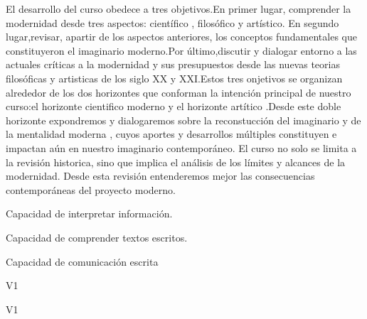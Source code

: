 \begin{syllabus}


\begin{justification}
El desarrollo del curso obedece a tres objetivos.En primer lugar, comprender la modernidad desde tres aspectos: científico , filosófico y artístico.
En segundo lugar,revisar, apartir de los aspectos anteriores, los conceptos fundamentales que constituyeron el imaginario moderno.Por último,discutir y 
dialogar entorno a las actuales críticas a la modernidad y sus presupuestos desde las nuevas teorias filosóficas y artisticas de los siglo XX y XXI.Estos
tres onjetivos se organizan alrededor de los dos horizontes que conforman la intención principal de nuestro curso:el horizonte cientifico moderno y el horizonte
artítico .Desde este doble horizonte expondremos y dialogaremos sobre la reconstucción del imaginario y de la mentalidad moderna , cuyos aportes y desarrollos 
múltiples constituyen e impactan aún en nuestro imaginario contemporáneo. El curso no solo se limita a la revisión historica, sino que implica el análisis de los
límites y alcances de la modernidad. Desde esta revisión entenderemos mejor las consecuencias contemporáneas del proyecto moderno.

\end{justification}

\begin{goals}
\item Capacidad de interpretar información.
\item Capacidad de comprender textos escritos.
\item Capacidad de comunicación escrita
\end{goals}

\begin{outcomes}{V1}
    \item {} %
    \item {} %
    \item {} %
    \item {} %
\end{outcomes}

\begin{competences}{V1}
    \item {}
    \item {}
    \item {}
    \item {}
\end{competences}


\end{syllabus}
